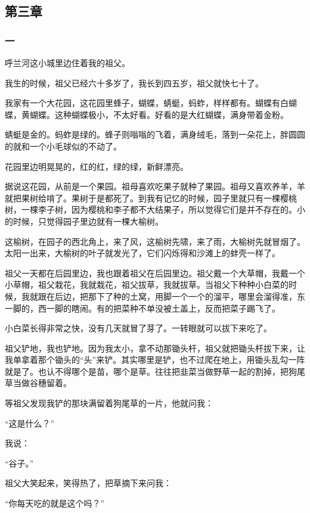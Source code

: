 \subsection{第三章}

\subsubsection*{一}
\par 呼兰河这小城里边住着我的祖父。
\par 我生的时候，祖父已经六十多岁了，我长到四五岁，祖父就快七十了。
\par 我家有一个大花园，这花园里蜂子，蝴蝶，蜻蜓，蚂蚱，样样都有。蝴蝶有白蝴蝶，黄蝴蝶。这种蝴蝶极小，不太好看。好看的是大红蝴蝶，满身带着金粉。
\par 蜻蜓是金的。蚂蚱是绿的。蜂子则嗡嗡的飞着，满身绒毛，落到一朵花上，胖圆圆的就和一个小毛球似的不动了。
\par 花园里边明晃晃的，红的红，绿的绿，新鲜漂亮。
\par 据说这花园，从前是一个果园。祖母喜欢吃果子就种了果园。祖母又喜欢养羊，羊就把果树给啃了。果树于是都死了。到我有记忆的时候，园子里就只有一棵樱桃树，一棵李子树，因为樱桃和李子都不大结果子，所以觉得它们是并不存在的。小的时候，只觉得园子里边就有一棵大榆树。
\par 这榆树，在园子的西北角上，来了风，这榆树先啸，来了雨，大榆树先就冒烟了。太阳一出来，大榆树的叶子就发光了，它们闪烁得和沙滩上的蚌壳一样了。
\par 祖父一天都在后园里边，我也跟着祖父在后园里边。祖父戴一个大草帽，我戴一个小草帽，祖父栽花，我就栽花，祖父拔草，我就拔草。当祖父下种种小白菜的时候，我就跟在后边，把那下了种的土窝，用脚一个一个的溜平，哪里会溜得准，东一脚的，西一脚的瞎闹。有的把菜种不单没被土盖上，反而把菜子踢飞了。
\par 小白菜长得非常之快，没有几天就冒了芽了。一转眼就可以拔下来吃了。
\par 祖父铲地，我也铲地。因为我太小，拿不动那锄头杆，祖父就把锄头杆拔下来，让我单拿着那个锄头的“头”来铲。其实哪里是铲，也不过爬在地上，用锄头乱勾一阵就是了。也认不得哪个是苗，哪个是草。往往把韭菜当做野草一起的割掉，把狗尾草当做谷穗留着。
\par 等祖父发现我铲的那块满留着狗尾草的一片，他就问我：
\par “这是什么？”
\par 我说：
\par “谷子。”
\par 祖父大笑起来，笑得热了，把草摘下来问我：
\par “你每天吃的就是这个吗？”
